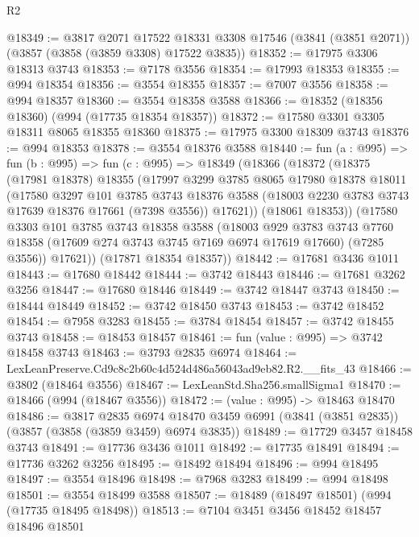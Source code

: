 \begin{lexlean}{R2}
\begin{coremodule}
@18349 := @3817
    @2071
    @17522
    @18331
    @3308
    @17546
    (@3841 (@3851 @2071))
    (@3857 (@3858 (@3859 @3308) @17522 @3835))
@18352 := @17975 @3306 @18313 @3743
@18353 := @7178 @3556
@18354 := @17993 @18353
@18355 := @994 @18354
@18356 := @3554 @18355
@18357 := @7007 @3556
@18358 := @994 @18357
@18360 := @3554 @18358 @3588
@18366 := @18352 (@18356 @18360) (@994 (@17735 @18354 @18357))
@18372 := @17580 @3301 @3305 @18311 @8065 @18355 @18360
@18375 := @17975 @3300 @18309 @3743
@18376 := @994 @18353
@18378 := @3554 @18376 @3588
@18440 := fun (a : @995) =>
  fun (b : @995) =>
  fun (c : @995) =>
  @18349
    (@18366
      (@18372
        (@18375
          (@17981 @18378)
          @18355
          (@17997
            @3299
            @3785
            @8065
            @17980
            @18378
            @18011
            (@17580
              @3297
              @101
              @3785
              @3743
              @18376
              @3588
              (@18003 @2230 @3783 @3743 @17639 @18376 @17661 (@7398 @3556))
              @17621))
          (@18061 @18353))
        (@17580
          @3303
          @101
          @3785
          @3743
          @18358
          @3588
          (@18003
            @929
            @3783
            @3743
            @7760
            @18358
            (@17609 @274 @3743 @3745 @7169 @6974 @17619 @17660)
            (@7285 @3556))
          @17621))
      (@17871 @18354 @18357))
@18442 := @17681 @3436 @1011
@18443 := @17680 @18442
@18444 := @3742 @18443
@18446 := @17681 @3262 @3256
@18447 := @17680 @18446
@18449 := @3742 @18447 @3743
@18450 := @18444 @18449
@18452 := @3742 @18450 @3743
@18453 := @3742 @18452
@18454 := @7958 @3283
@18455 := @3784 @18454
@18457 := @3742 @18455 @3743
@18458 := @18453 @18457
@18461 := fun (value : @995) => @3742 @18458 @3743
@18463 := @3793 @2835 @6974
@18464 := LexLeanPreserve.Cd9c8c2b60c4d524d486a56043ad9eb82.R2.__fits_43
@18466 := @3802 (@18464 @3556)
@18467 := LexLeanStd.Sha256.smallSigma1
@18470 := @18466 (@994 (@18467 @3556))
@18472 := (value : @995) -> @18463 @18470
@18486 := @3817
    @2835
    @6974
    @18470
    @3459
    @6991
    (@3841 (@3851 @2835))
    (@3857 (@3858 (@3859 @3459) @6974 @3835))
@18489 := @17729 @3457 @18458 @3743
@18491 := @17736 @3436 @1011
@18492 := @17735 @18491
@18494 := @17736 @3262 @3256
@18495 := @18492 @18494
@18496 := @994 @18495
@18497 := @3554 @18496
@18498 := @7968 @3283
@18499 := @994 @18498
@18501 := @3554 @18499 @3588
@18507 := @18489 (@18497 @18501) (@994 (@17735 @18495 @18498))
@18513 := @7104 @3451 @3456 @18452 @18457 @18496 @18501

\end{coremodule}
\end{lexlean}
